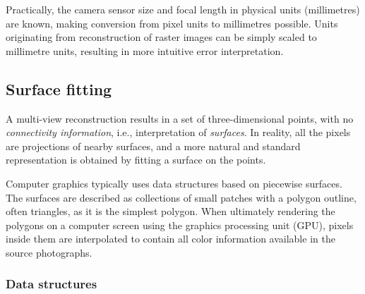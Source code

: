 
Practically, the camera sensor size and focal length in physical units (millimetres) are known, making conversion from pixel units to millimetres possible.
Units originating from reconstruction of raster images can be simply scaled to millimetre units, resulting in more intuitive error interpretation.




\subsection{Surface fitting} %

A multi-view reconstruction results in a set of three-dimensional points, with no \emph{connectivity information}, i.e., interpretation of \emph{surfaces}.
In reality, all the pixels are projections of nearby surfaces, and a more natural and standard representation is obtained by fitting a surface on the points.

Computer graphics typically uses data structures based on piecewise surfaces.
The surfaces are described as collections of small patches with a polygon outline, often triangles, as it is the simplest polygon.
When ultimately rendering the polygons on a computer screen using the graphics processing unit (GPU), pixels inside them are interpolated to contain all color information available in the source photographs.


\subsubsection{Data structures} %


